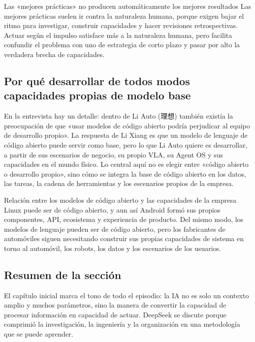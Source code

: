 \begin{warningbox}{Las «mejores prácticas» no producen automáticamente los mejores resultados}
Las mejores prácticas suelen ir contra la naturaleza humana, porque exigen bajar el ritmo para investigar, construir capacidades y hacer revisiones retrospectivas. Actuar según el impulso satisface más a la naturaleza humana, pero facilita confundir el problema con uno de estrategia de corto plazo y pasar por alto la verdadera brecha de capacidades.
\end{warningbox}

\subsection{Por qué desarrollar de todos modos capacidades propias de modelo base}

En la entrevista hay un detalle: dentro de Li Auto (理想) también existía la preocupación de que «usar modelos de código abierto podría perjudicar al equipo de desarrollo propio». La respuesta de Li Xiang es que un modelo de lenguaje de código abierto puede servir como base, pero lo que Li Auto quiere es desarrollar, a partir de sus escenarios de negocio, su propio VLA, su Agent OS y sus capacidades en el mundo físico. Lo central aquí no es elegir entre «código abierto o desarrollo propio», sino cómo se integra la base de código abierto en los datos, las tareas, la cadena de herramientas y los escenarios propios de la empresa.

\begin{knowledgebox}{Relación entre los modelos de código abierto y las capacidades de la empresa}
Linux puede ser de código abierto, y aun así Android formó sus propios componentes, API, ecosistema y experiencia de producto. Del mismo modo, los modelos de lenguaje pueden ser de código abierto, pero los fabricantes de automóviles siguen necesitando construir sus propias capacidades de sistema en torno al automóvil, los robots, los datos y los escenarios de los usuarios.
\end{knowledgebox}

\subsection{Resumen de la sección}

El capítulo inicial marca el tono de todo el episodio: la IA no es solo un contexto amplio y muchos parámetros, sino la manera de convertir la capacidad de procesar información en capacidad de actuar. DeepSeek se discute porque comprimió la investigación, la ingeniería y la organización en una metodología que se puede aprender.
